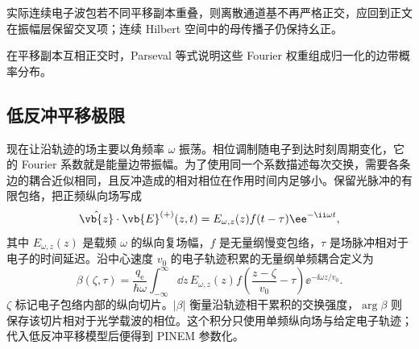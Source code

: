 实际连续电子波包若不同平移副本重叠，则离散通道基不再严格正交，应回到正文 在振幅层保留交叉项；连续 Hilbert 空间中的母传播子仍保持幺正。

在平移副本互相正交时，Parseval 等式说明这些 Fourier 权重组成归一化的边带概率分布。

\subsection{低反冲平移极限}

现在让沿轨迹的场主要以角频率 $\omega$ 振荡。相位调制随电子到达时刻周期变化，它的 Fourier 系数就是能量边带振幅。为了使用同一个系数描述每次交换，需要各条边的耦合近似相同，且反冲造成的相对相位在作用时间内足够小。保留光脉冲的有限包络，把正频纵向场写成
\begin{equation*}
\hat{\vb{z}}\cdot\vb{E}^{(+)}(z,t)
=E_{\omega,z}(z)f(t-\tau)\ee^{-\ii\omega t},
\end{equation*}
其中 $E_{\omega,z}(z)$ 是载频 $\omega$ 的纵向复场幅，$f$ 是无量纲慢变包络，$\tau$ 是场脉冲相对于电子的时间延迟。沿中心速度 $v_0$ 的电子轨迹积累的无量纲单频耦合定义为
\begin{equation}
{
\beta(\zeta,\tau)
=\frac{q_{\mathrm e}}{\hbar\omega}
\int_{-\infty}^{\infty}\dd z\,
E_{\omega,z}(z)
 f\!\left(\frac{z-\zeta}{v_0}-\tau\right)
\ee^{-\ii\omega z/v_0}.}
\label{eq:pinem_standard_beta_pulsed}
\end{equation}
$\zeta$ 标记电子包络内部的纵向切片。$|\beta|$ 衡量沿轨迹相干累积的交换强度，$\arg\beta$ 则保存该切片相对于光学载波的相位。这个积分只使用单频纵向场与给定电子轨迹；代入低反冲平移模型后便得到 PINEM 参数化。

